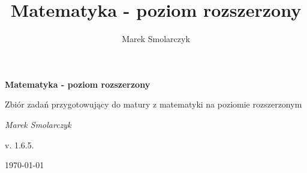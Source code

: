 \documentclass[a4paper,12pt]{book}
\begin{document}
\frontmatter

\begin{titlepage}
	\centering
	{ \bfseries \LARGE Matematyka - poziom rozszerzony \par }
	\vspace{1cm}
	{ \large Zbiór zadań przygotowujący do matury z matematyki na poziomie rozszerzonym \par }
	\vspace{3cm}
	{ \itshape \large Marek Smolarczyk \par }
	\vfill
	{ \large v. 1.6.5. \par }
	\vspace{0.2cm}
	{ \large \today \par }
\end{titlepage}

\author{Marek Smolarczyk}
\title{Matematyka - poziom rozszerzony}

\tableofcontents


\mainmatter



\backmatter
\end{document}
